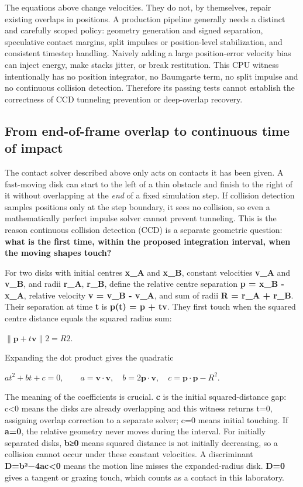 The equations above change velocities. They do not, by themselves, repair existing overlaps in positions. A production pipeline generally needs a distinct and carefully scoped policy: geometry generation and signed separation, speculative contact margins, split impulses or position-level stabilization, and consistent timestep handling. Naively adding a large position-error velocity bias can inject energy, make stacks jitter, or break restitution. This CPU witness intentionally has no position integrator, no Baumgarte term, no split impulse and no continuous collision detection. Therefore its passing tests cannot establish the correctness of CCD tunneling prevention or deep-overlap recovery.

\subsection{From end-of-frame overlap to continuous time of impact}\label{appendix-c9d92e145503-from-end-of-frame-overlap-to-continuous-time-of-impact}

The contact solver described above only acts on contacts it has been given. A fast-moving disk can start to the left of a thin obstacle and finish to the right of it without overlapping at the \emph{end} of a fixed simulation step. If collision detection samples positions only at the step boundary, it sees no collision, so even a mathematically perfect impulse solver cannot prevent tunneling. This is the reason continuous collision detection (CCD) is a separate geometric question: \textbf{what is the first time, within the proposed integration interval, when the moving shapes touch?}

For two disks with initial centres \textbf{x\_A} and \textbf{x\_B}, constant velocities \textbf{v\_A} and \textbf{v\_B}, and radii \textbf{r\_A}, \textbf{r\_B}, define the relative centre separation \textbf{p = x\_B - x\_A}, relative velocity \textbf{v = v\_B - v\_A}, and sum of radii \textbf{R = r\_A + r\_B}. Their separation at time \textbf{t} is \textbf{p(t) = p + tv}. They first touch when the squared centre distance equals the squared radius sum:

\(\lVert \mathbf p+t\mathbf v\rVert2=R2.\)

Expanding the dot product gives the quadratic

\(at^2+bt+c=0,\qquad a=\mathbf v\cdot\mathbf v,\quad b=2\mathbf p\cdot\mathbf v,\quad c=\mathbf p\cdot\mathbf p-R^2.\)

The meaning of the coefficients is crucial. \textbf{c} is the initial squared-distance gap: c\textless0 means the disks are already overlapping and this witness returns t=0, assigning overlap correction to a separate solver; c=0 means initial touching. If \textbf{a=0}, the relative geometry never moves during the interval. For initially separated disks, \textbf{b≥0} means squared distance is not initially decreasing, so a collision cannot occur under these constant velocities. A discriminant \textbf{D=b²−4ac\textless0} means the motion line misses the expanded-radius disk. \textbf{D=0} gives a tangent or grazing touch, which counts as a contact in this laboratory.

